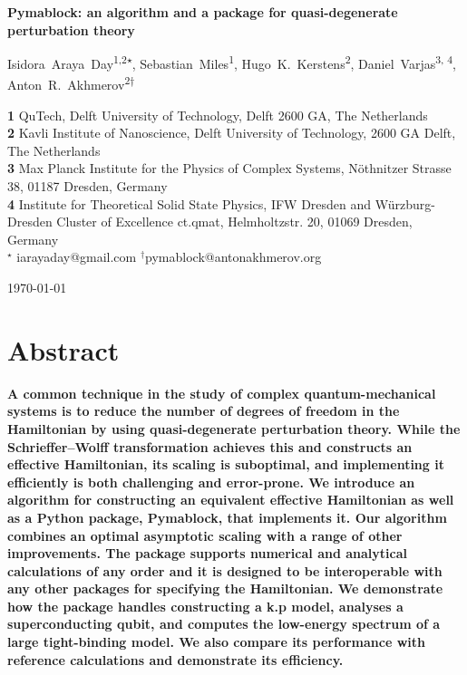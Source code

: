 \documentclass[submission, Codebases]{SciPost}
\begin{document}
\begin{center}
{\Large \textbf{Pymablock: an algorithm and a package for quasi-degenerate perturbation theory}}
\end{center}

\begin{center}
Isidora~Araya~Day\textsuperscript{1,2$\star$},
Sebastian~Miles\textsuperscript{1},
Hugo~K.~Kerstens\textsuperscript{2},
Daniel~Varjas\textsuperscript{3, 4},
Anton~R.~Akhmerov\textsuperscript{2$\dagger$}
\end{center}

\begin{center}
\textbf{1} QuTech, Delft University of Technology, Delft 2600 GA, The Netherlands \\
\textbf{2} Kavli Institute of Nanoscience, Delft University of Technology, 2600 GA Delft, The Netherlands \\
\textbf{3} Max Planck Institute for the Physics of Complex Systems, Nöthnitzer Strasse 38, 01187 Dresden, Germany \\
\textbf{4} Institute for Theoretical Solid State Physics, IFW Dresden and W\"{u}rzburg-Dresden Cluster of Excellence ct.qmat, Helmholtzstr. 20, 01069 Dresden, Germany \\
${}^\star$ {\small \sf iarayaday@gmail.com}
${}^\dagger${\small \sf pymablock@antonakhmerov.org}
\end{center}

\begin{center}
    \today
\end{center}

\section*{Abstract}
\textbf{
A common technique in the study of complex quantum-mechanical systems is to reduce the number of degrees of freedom in the Hamiltonian by using quasi-degenerate perturbation theory.
While the Schrieffer--Wolff transformation achieves this and constructs an effective Hamiltonian, its scaling is suboptimal, and implementing it efficiently is both challenging and error-prone.
We introduce an algorithm for constructing an equivalent effective Hamiltonian as well as a Python package, Pymablock, that implements it.
Our algorithm combines an optimal asymptotic scaling with a range of other improvements.
The package supports numerical and analytical calculations of any order and it is designed to be interoperable with any other packages for specifying the Hamiltonian.
We demonstrate how the package handles constructing a k.p model, analyses a superconducting qubit, and computes the low-energy spectrum of a large tight-binding model.
We also compare its performance with reference calculations and demonstrate its efficiency.
}
\end{document}
